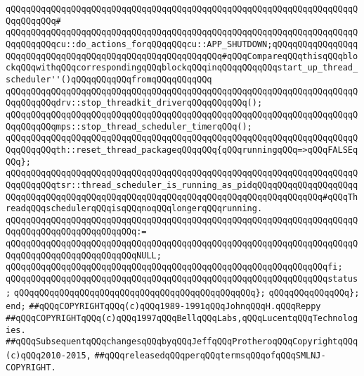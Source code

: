 \verb|qQQqqQQqqQQqqQQqqQQqqQQqqQQqqQQqqQQqqQQqqQQqqQQqqQQqqQQqqQQqqQQqqQQqqQQqqQQqqQQq#|\newline
\verb|qQQqqQQqqQQqqQQqqQQqqQQqqQQqqQQqqQQqqQQqqQQqqQQqqQQqqQQqqQQqqQQqqQQqqQQqqQQqqQQqcu::do_actions_forqQQqqQQqcu::APP_SHUTDOWN;qQQqqQQqqQQqqQQqqQQqqQQqqQQqqQQqqQQqqQQqqQQqqQQqqQQqqQQqqQQq#qQQqCompareqQQqthisqQQqblockqQQqwithqQQqcorrespondingqQQqblockqQQqinqQQqqQQqqQQqstart_up_thread_scheduler''()qQQqqQQqqQQqfromqQQqqQQqqQQq|\newline
\verb|qQQqqQQqqQQqqQQqqQQqqQQqqQQqqQQqqQQqqQQqqQQqqQQqqQQqqQQqqQQqqQQqqQQqqQQqqQQqqQQqdrv::stop_threadkit_driverqQQqqQQqqQQq();|\newline
\verb|qQQqqQQqqQQqqQQqqQQqqQQqqQQqqQQqqQQqqQQqqQQqqQQqqQQqqQQqqQQqqQQqqQQqqQQqqQQqqQQqmps::stop_thread_scheduler_timerqQQq();|\newline
\verb|qQQqqQQqqQQqqQQqqQQqqQQqqQQqqQQqqQQqqQQqqQQqqQQqqQQqqQQqqQQqqQQqqQQqqQQqqQQqqQQqth::reset_thread_packageqQQqqQQq{qQQqrunningqQQq=>qQQqFALSEqQQq};|\newline
\newline
\verb|qQQqqQQqqQQqqQQqqQQqqQQqqQQqqQQqqQQqqQQqqQQqqQQqqQQqqQQqqQQqqQQqqQQqqQQqqQQqqQQqtsr::thread_scheduler_is_running_as_pidqQQqqQQqqQQqqQQqqQQqqQQqqQQqqQQqqQQqqQQqqQQqqQQqqQQqqQQqqQQqqQQqqQQqqQQqqQQqqQQqqQQq#qQQqThreadqQQqschedulerqQQqisqQQqnoqQQqlongerqQQqrunning.|\newline
\verb|qQQqqQQqqQQqqQQqqQQqqQQqqQQqqQQqqQQqqQQqqQQqqQQqqQQqqQQqqQQqqQQqqQQqqQQqqQQqqQQqqQQqqQQqqQQqqQQq:=|\newline
\verb|qQQqqQQqqQQqqQQqqQQqqQQqqQQqqQQqqQQqqQQqqQQqqQQqqQQqqQQqqQQqqQQqqQQqqQQqqQQqqQQqqQQqqQQqqQQqqQQqNULL;|\newline
\verb|qQQqqQQqqQQqqQQqqQQqqQQqqQQqqQQqqQQqqQQqqQQqqQQqqQQqqQQqqQQqqQQqfi;|\newline
\newline
\verb|qQQqqQQqqQQqqQQqqQQqqQQqqQQqqQQqqQQqqQQqqQQqqQQqqQQqqQQqqQQqqQQqstatus;|\newline
\verb|qQQqqQQqqQQqqQQqqQQqqQQqqQQqqQQqqQQqqQQqqQQqqQQq};|\newline
\verb|qQQqqQQqqQQqqQQq};|\newline
\verb|end;|\newline
\newline
\verb|##qQQqCOPYRIGHTqQQq(c)qQQq1989-1991qQQqJohnqQQqH.qQQqReppy|\newline
\verb|##qQQqCOPYRIGHTqQQq(c)qQQq1997qQQqBellqQQqLabs,qQQqLucentqQQqTechnologies.|\newline
\verb|##qQQqSubsequentqQQqchangesqQQqbyqQQqJeffqQQqProtheroqQQqCopyrightqQQq(c)qQQq2010-2015,|\newline
\verb|##qQQqreleasedqQQqperqQQqtermsqQQqofqQQqSMLNJ-COPYRIGHT.|\newline

